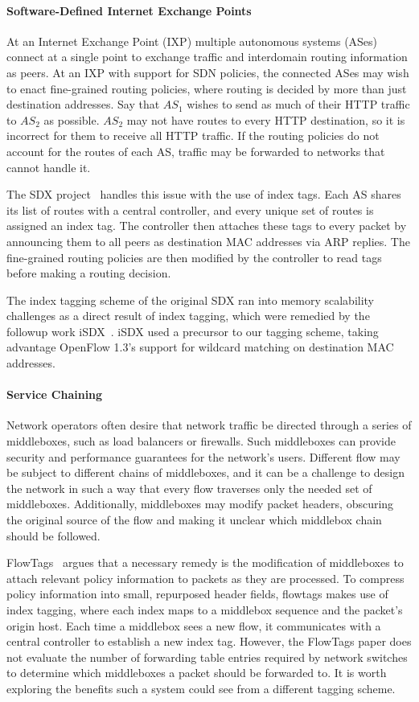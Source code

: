 \paragraph{Software-Defined Internet Exchange Points}
At an Internet Exchange Point (IXP) multiple autonomous systems (ASes) connect at a single point to exchange traffic and interdomain routing information as peers.  At an IXP with support for SDN policies, the connected ASes may wish to enact fine-grained routing policies, where routing is decided by more than just destination addresses. Say that $AS_1$ wishes to send as much of their HTTP traffic to $AS_2$ as possible. $AS_2$ may not have routes to every HTTP destination, so it is incorrect for them to receive all HTTP traffic. If the routing policies do not account for the routes of each AS, traffic may be forwarded to networks that cannot handle it. 

The SDX project~\cite{sdx} handles this issue with the use of index tags. Each AS shares its list of routes with a central controller, and every unique set of routes is assigned an index tag. The controller then attaches these tags to every packet by announcing them to all peers as destination MAC addresses via ARP replies. The fine-grained routing policies are then modified by the controller to read tags before making a routing decision. 

The index tagging scheme of the original SDX ran into memory scalability challenges as a direct result of index tagging, which were remedied by the followup work iSDX~\cite{isdx}. iSDX used a precursor to our tagging scheme, taking advantage OpenFlow 1.3's support for wildcard matching on destination MAC addresses. 

\paragraph{Service Chaining}
Network operators often desire that network traffic be directed through a series of middleboxes, such as load balancers or firewalls. Such middleboxes can provide security and performance guarantees for the network's users.
 Different flow may be subject to different chains of middleboxes, and it can be a challenge to design the network in such a way that every flow traverses only the needed set of middleboxes. Additionally, middleboxes may modify packet headers, obscuring the original source of the flow and making it unclear which middlebox chain should be followed. 
 
FlowTags~\cite{flowtags} argues that a necessary remedy is the modification of middleboxes to attach relevant policy information to packets as they are processed. To compress policy information into small, repurposed header fields, flowtags makes use of index tagging, where each index maps to a middlebox sequence and the packet's origin host. Each time a middlebox sees a new flow, it communicates with a central controller to establish a new index tag. 
However, the FlowTags paper does not evaluate the number of forwarding table entries required by network switches to determine which middleboxes a packet should be forwarded to. It is worth exploring the benefits such a system could see from a different tagging scheme. 
 

